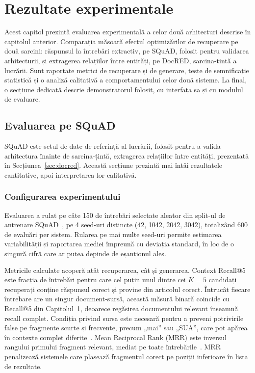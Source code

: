 \chapter{Rezultate experimentale}

Acest capitol prezintă evaluarea experimentală a celor două arhitecturi descrise în capitolul anterior. Comparația măsoară efectul optimizărilor de recuperare pe două sarcini: răspunsul la întrebări extractiv, pe SQuAD, folosit pentru validarea arhitecturii, și extragerea relațiilor între entități, pe DocRED, sarcina-țintă a lucrării. Sunt raportate metrici de recuperare și de generare, teste de semnificație statistică și o analiză calitativă a comportamentului celor două sisteme. La final, o secțiune dedicată descrie demonstratorul folosit, cu interfața sa și cu modulul de evaluare.

\section{Evaluarea pe SQuAD}

SQuAD este setul de date de referință al lucrării, folosit pentru a valida arhitectura înainte de sarcina-țintă, extragerea relațiilor între entități, prezentată în Secțiunea~\ref{sec:docred}. Această secțiune prezintă mai întâi rezultatele cantitative, apoi interpretarea lor calitativă.

\subsection{Configurarea experimentului}

Evaluarea a rulat pe câte 150 de întrebări selectate aleator din split-ul de antrenare SQuAD~\cite{rajpurkar-etal-2016-squad}, pe 4 seed-uri distincte (42, 1042, 2042, 3042), totalizând 600 de evaluări per sistem. Rularea pe mai multe seed-uri permite estimarea variabilității și raportarea mediei împreună cu deviația standard, în loc de o singură cifră care ar putea depinde de eșantionul ales.

Metricile calculate acoperă atât recuperarea, cât și generarea. Context Recall@5 este fracția de întrebări pentru care cel puțin unul dintre cei $K{=}5$ candidați recuperați conține răspunsul corect și provine din articolul corect. Întrucât fiecare întrebare are un singur document-sursă, această măsură binară coincide cu Recall@5 din Capitolul~1, deoarece regăsirea documentului relevant înseamnă recall complet. Condiția privind sursa este necesară pentru a preveni potrivirile false pe fragmente scurte și frecvente, precum „mai” sau „SUA”, care pot apărea în contexte complet diferite~\cite{rajpurkar-etal-2016-squad}. Mean Reciprocal Rank (MRR) este inversul rangului primului fragment relevant, mediat pe toate întrebările~\cite{karpukhin2020dpr}. MRR penalizează sistemele care plasează fragmentul corect pe poziții inferioare în lista de rezultate.


